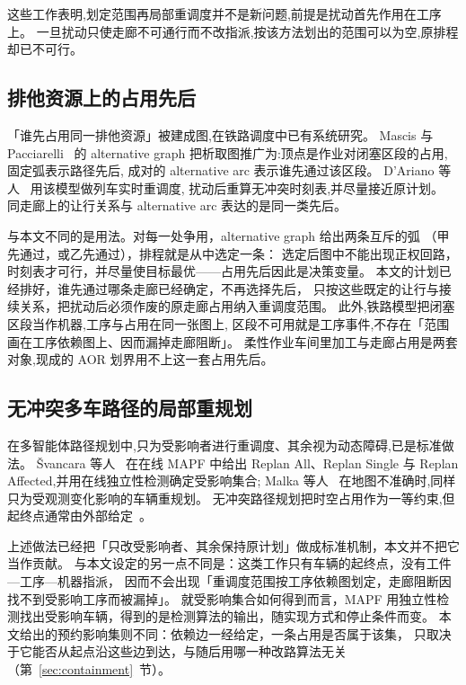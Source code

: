 \documentclass[manuscript,screen,review]{acmart}
\begin{document}
这些工作表明,划定范围再局部重调度并不是新问题,前提是扰动首先作用在工序上。
一旦扰动只使走廊不可通行而不改指派,按该方法划出的范围可以为空,原排程却已不可行。

\subsection{排他资源上的占用先后}
\label{sec:rw_ag}

「谁先占用同一排他资源」被建成图,在铁路调度中已有系统研究。
Mascis 与 Pacciarelli~\cite{mascis2002alternative} 的 alternative graph
把析取图推广为:顶点是作业对闭塞区段的占用,固定弧表示路径先后,
成对的 alternative arc 表示谁先通过该区段。
D'Ariano 等人~\cite{dariano2007branch} 用该模型做列车实时重调度,
扰动后重算无冲突时刻表,并尽量接近原计划。
同走廊上的让行关系与 alternative arc 表达的是同一类先后。

与本文不同的是用法。对每一处争用，alternative graph 给出两条互斥的弧
（甲先通过，或乙先通过），排程就是从中选定一条：
选定后图中不能出现正权回路，时刻表才可行，并尽量使目标最优——占用先后因此是决策变量。
本文的计划已经排好，谁先通过哪条走廊已经确定，不再选择先后，
只按这些既定的让行与接续关系，把扰动后必须作废的原走廊占用纳入重调度范围。
此外,铁路模型把闭塞区段当作机器,工序与占用在同一张图上,
区段不可用就是工序事件,不存在「范围画在工序依赖图上、因而漏掉走廊阻断」。
柔性作业车间里加工与走廊占用是两套对象,现成的 AOR 划界用不上这一套占用先后。

\subsection{无冲突多车路径的局部重规划}
\label{sec:rw_mapf}

在多智能体路径规划中,只为受影响者进行重调度、其余视为动态障碍,已是标准做法。
Švancara 等人~\cite{svancara2019online} 在在线 MAPF 中给出
Replan All、Replan Single 与 Replan Affected,并用在线独立性检测确定受影响集合;
Malka 等人~\cite{malka2024online} 在地图不准确时,同样只为受观测变化影响的车辆重规划。
无冲突路径规划把时空占用作为一等约束,但起终点通常由外部给定~\cite{zhang2024guidance}。

上述做法已经把「只改受影响者、其余保持原计划」做成标准机制，本文并不把它当作贡献。
与本文设定的另一点不同是：这类工作只有车辆的起终点，没有工件—工序—机器指派，
因而不会出现「重调度范围按工序依赖图划定，走廊阻断因找不到受影响工序而被漏掉」。
就受影响集合如何得到而言，MAPF 用独立性检测找出受影响车辆，得到的是检测算法的输出，随实现方式和停止条件而变。
本文给出的预约影响集则不同：依赖边一经给定，一条占用是否属于该集，
只取决于它能否从起点沿这些边到达，与随后用哪一种改路算法无关
（第~\ref{sec:containment}~节）。
\end{document}
